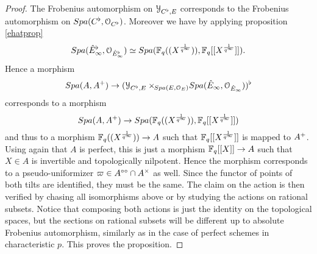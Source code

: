 \begin{proof}
The Frobenius automorphism on $\mathcal{Y}_{C^{\flat},E}$ corresponds to the Frobenius automorphism on ${Spa({C^{\flat}},{\mathcal{O}_{C^{\flat}}})}$. 
Moreover we have by applying proposition \ref{ehatprop}
\[{Spa({\hat{E}_{\infty}^{\flat}},{\mathcal{O}_{\hat{E}_{\infty}^{\flat}}})} \simeq{Spa({\mathbb{F}_q((X^{\frac{1}{q^\infty}}))},{\mathbb{F}_q[[X^{\frac{1}{q^\infty}}]]})}.\]
Hence a morphism $${Spa({A},{A{^{+}}})}\to (\mathcal{Y}_{C^{\flat},E}\times\!\!_{{Spa({E},{\mathcal{O}_E})}}{Spa({\hat{E}_{\infty}},{\mathcal{O}_{\hat{E}_{\infty}}})})^{\flat}$$ corresponds to a morphism 
 $${Spa({A},{A{^{+}}})}\to {Spa({\mathbb{F}_q((X^{\frac{1}{q^\infty}}))},{\mathbb{F}_q[[X^{\frac{1}{q^\infty}}]]})}$$
and thus to a morphism $\mathbb{F}_q((X^{\frac{1}{q^\infty}}))\to A$ such that $\mathbb{F}_q[[X^{\frac{1}{q^\infty}}]]$ is mapped to $A{^{+}}$. Using again that $A$ is perfect, this is just a morphism
$\mathbb{F}_q[[X]]\to A$ such that $X\in A$ is invertible and topologically nilpotent. Hence the morphism corresponds to a pseudo-uniformizer  $\varpi\in A^{\circ\circ}\cap A^{\times}$ as well. Since the functor of points of both tilts are identified, they must be the same. The claim on the action is then verified by chasing all isomorphisms above or by studying the actions on rational subsets. Notice that composing both actions is just the identity on the topological spaces, but the sections on rational subsets will be different up to absolute Frobenius automorphism, similarly as in the case of perfect schemes in characteristic $p$. This proves the proposition.









\end{proof}






























